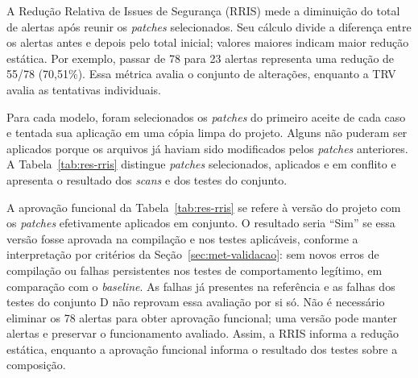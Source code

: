\label{sec:res-rris}

A Redução Relativa de Issues de Segurança (RRIS) mede a diminuição do total de alertas após reunir os \textit{patches} selecionados. Seu cálculo divide a diferença entre os alertas antes e depois pelo total inicial; valores maiores indicam maior redução estática. Por exemplo, passar de 78 para 23 alertas representa uma redução de 55/78 (70,51\%). Essa métrica avalia o conjunto de alterações, enquanto a TRV avalia as tentativas individuais.

Para cada modelo, foram selecionados os \textit{patches} do primeiro aceite de cada caso e tentada sua aplicação em uma cópia limpa do projeto. Alguns não puderam ser aplicados porque os arquivos já haviam sido modificados pelos \textit{patches} anteriores. A Tabela~\ref{tab:res-rris} distingue \textit{patches} selecionados, aplicados e em conflito e apresenta o resultado dos \textit{scans} e dos testes do conjunto.

A aprovação funcional da Tabela~\ref{tab:res-rris} se refere à versão do projeto com os \textit{patches} efetivamente aplicados em conjunto. O resultado seria ``Sim'' se essa versão fosse aprovada na compilação e nos testes aplicáveis, conforme a interpretação por critérios da Seção~\ref{sec:met-validacao}: sem novos erros de compilação ou falhas persistentes nos testes de comportamento legítimo, em comparação com o \textit{baseline}. As falhas já presentes na referência e as falhas dos testes do conjunto D não reprovam essa avaliação por si só. Não é necessário eliminar os 78 alertas para obter aprovação funcional; uma versão pode manter alertas e preservar o funcionamento avaliado. Assim, a RRIS informa a redução estática, enquanto a aprovação funcional informa o resultado dos testes sobre a composição.

